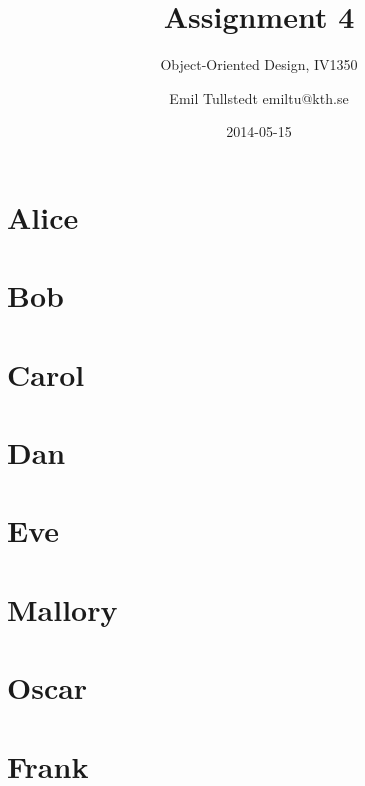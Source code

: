 \documentclass[a4paper]{scrreprt}
\title{Assignment 4}
\subtitle{Object-Oriented Design, IV1350}
\author{Emil Tullstedt emiltu@kth.se}
\date{2014-05-15}
\begin{document}
\chapter{Alice}



\chapter{Bob}



\chapter{Carol}



\chapter{Dan}



\chapter{Eve}



\chapter{Mallory}



\chapter{Oscar}



\chapter{Frank}

\end{document}
